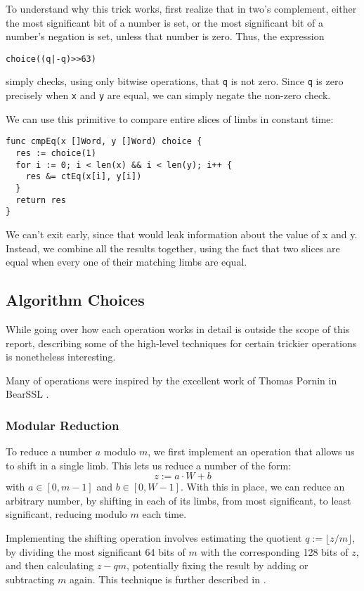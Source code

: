 \documentclass[11pt, a4paper]{article} %
\begin{document}
{To understand why this trick works, first realize that in two's complement,
either the most significant bit of a number is set, or the most significant
bit of a number's negation is set, unless that number is zero.
Thus, the expression
\begin{verbatim}
choice((q|-q)>>63)
\end{verbatim}
simply checks, using only bitwise operations, that
\texttt{q} is not zero.
Since \texttt{q} is zero precisely when \texttt{x} and \texttt{y}
are equal, we can simply negate the non-zero check.

We can use this primitive to compare entire slices of limbs
in constant time:

\begin{verbatim}
func cmpEq(x []Word, y []Word) choice {
  res := choice(1)
  for i := 0; i < len(x) && i < len(y); i++ {
    res &= ctEq(x[i], y[i])
  }
  return res
}
\end{verbatim}

We can't exit early, since that would leak information about
the value of x and y. Instead, we combine all the results together,
using the fact that two slices are equal when every one of their
matching limbs are equal.

\subsection{Algorithm Choices}

While going over how each operation works in detail is outside
the scope of this report, describing some of the high-level
techniques for certain trickier operations is nonetheless interesting.

Many of operations were inspired by the excellent
work of Thomas Pornin in BearSSL
\cite{pornin_bearssl_2020-1}.

\subsubsection{Modular Reduction}

To reduce a number $a$ modulo $m$, we first implement an operation
that allows us to shift in a single limb. This
lets us reduce a number
of the form:
$$
z := a \cdot W + b
$$
with $a \in [0, m - 1]$ and $b \in [0, W - 1]$. With this in place,
we can reduce an arbitrary number, by shifting in each of its limbs,
from most significant, to least significant, reducing modulo $m$
each time.

Implementing the shifting operation involves estimating
the quotient $q := \lfloor z / m \rfloor$, by dividing
the most significant 64 bits of $m$ with
the corresponding 128 bits of $z$,
and then
calculating $z - q m$, potentially fixing the result
by adding or subtracting $m$ again.
This technique is further described in \cite{pornin_bearssl_2020-1}.


}
\end{document}
